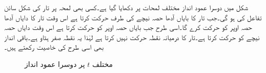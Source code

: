 شکل  میں دوسرا عمود انداز مختلف لمحات  پر دکھایا گیا ہے۔کسی بھی لمحہ پر تار کی شکل سائن تفاعل کی ہو گی۔جب تار کا بایاں آدھا حصہ نیچے کی طرف حرکت کرتا ہے اس وقت تار کا دایاں آدھا حصہ اوپر کو حرکت کرے گا۔اسی طرح جب بایاں حصہ اوپر کو حرکت کرتا ہے اس وقت دایاں حصہ نیچے کو حرکت کرتا ہے۔تار کا درمیانہ نقطہ حرکت نہیں کرتا ہے لہٰذا یہ نقطہ صفر ہٹاو ہے۔باقی انداز بھی اسی طرح کی خاصیت رکھتے ہیں۔
\begin{figure}
\centering
{}
\caption{مختلف $t$ پر دوسرا عمود انداز}
\label{شکل_جزوی_مختلف_لمحات_دوسرا_قائمہ_انداز}
\end{figure}

